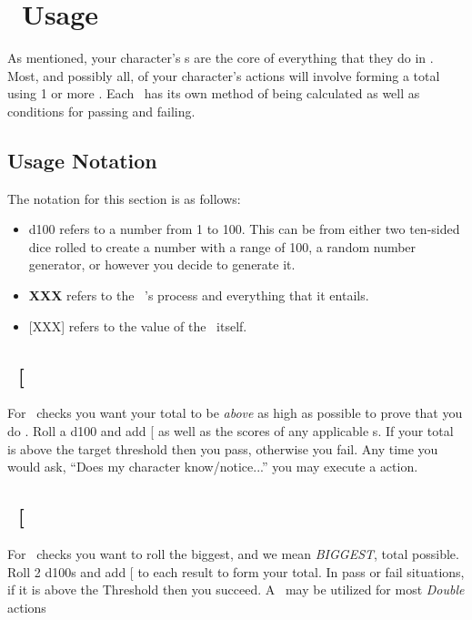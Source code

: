 \section{\attribute\ Usage}\label{sec:attr_usage}
As mentioned, your character's \attribute s are the core of everything that they do in \gametitle. Most, and possibly all, of your character's actions will involve forming a total using 1 or more \attribute . Each \attribute\ has its own method of being calculated as well as conditions for passing and failing. 

\subsection*{Usage Notation}\label{subsec:notation}
The notation for this section is as follows:
\begin{itemize}
	\item d100 refers to a number from 1 to 100. This can be from either two ten-sided dice rolled to create a number with a range of 100, a random number generator, or however you decide to generate it.
	\item \textbf{XXX} refers to the \attribute\ 's process and everything that it entails.
	\item {[}XXX{]} refers to the value of the \attribute\ itself.
\end{itemize}
\clearpage

\subsection{\KNOWful\ {[}\KNOW\index{\attribute!\KNOWful}{]}}\label{subsec:kno}
\noindent For \KNOWful\ checks you want your total to be \textit{above} as high as possible to prove that you do \KNOW .
\noindent Roll a d100 and add {[}\KNOW{]} as well as the scores of any applicable \skill s. If your total is above the target threshold then you pass, otherwise you fail.
\fillrlinemid
\noindent Any time you would ask, ``Does my character know/notice...'' you may execute a \textbf{\KNOW} action. 

\clearpage
\subsection{\POWEful\ {[}\POWE\index{\attribute!\POWEful}{]}}\label{subsec:pow}
\noindent For \POWEful\ checks you want to roll the biggest, and we mean \emph{BIGGEST}, total possible.
\noindent Roll 2 d100s and add {[}\POWE{]} to each result to form your total. In pass or fail situations, if it is above the Threshold then you succeed.
\fillrlinemid
\noindent A \POWE\ may be utilized for most \emph{Double} actions

